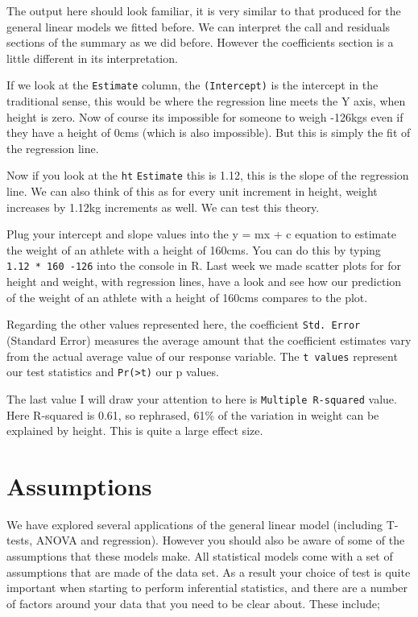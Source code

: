 \documentclass[
]{book}
\begin{document}
The output here should look familiar, it is very similar to that produced for the general linear models we fitted before. We can interpret the call and residuals sections of the summary as we did before. However the coefficients section is a little different in its interpretation.

If we look at the \texttt{Estimate} column, the \texttt{(Intercept)} is the intercept in the traditional sense, this would be where the regression line meets the Y axis, when height is zero. Now of course its impossible for someone to weigh -126kgs even if they have a height of 0cms (which is also impossible). But this is simply the fit of the regression line.

Now if you look at the \texttt{ht} \texttt{Estimate} this is 1.12, this is the slope of the regression line. We can also think of this as for every unit increment in height, weight increases by 1.12kg increments as well. We can test this theory.

Plug your intercept and slope values into the y = mx + c equation to estimate the weight of an athlete with a height of 160cms. You can do this by typing \texttt{1.12\ *\ 160\ -126} into the console in R. Last week we made scatter plots for for height and weight, with regression lines, have a look and see how our prediction of the weight of an athlete with a height of 160cms compares to the plot.

Regarding the other values represented here, the coefficient \texttt{Std.\ Error} (Standard Error) measures the average amount that the coefficient estimates vary from the actual average value of our response variable. The \texttt{t\ values} represent our test statistics and \texttt{Pr(\textgreater{}\textbar{}t\textbar{})} our p values.

The last value I will draw your attention to here is \texttt{Multiple\ R-squared} value. Here R-squared is 0.61, so rephrased, 61\% of the variation in weight can be explained by height. This is quite a large effect size.

\hypertarget{assumptions}{%
\section{Assumptions}\label{assumptions}}

We have explored several applications of the general linear model (including T-tests, ANOVA and regression). However you should also be aware of some of the assumptions that these models make. All statistical models come with a set of assumptions that are made of the data set. As a result your choice of test is quite important when starting to perform inferential statistics, and there are a number of factors around your data that you need to be clear about. These include;
\end{document}
